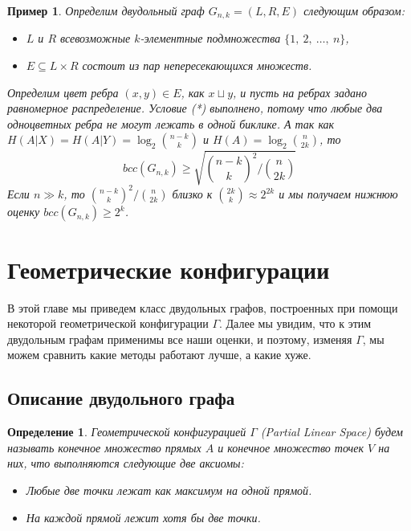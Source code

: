 \documentclass[a4paper]{article}
\newtheorem*{mdefinition}{Определение}
\newtheorem*{mexample}{Пример}
\begin{document}
\begin{mexample}
    Определим двудольный граф $G_{n,k} = (L, R, E)$ следующим образом: 
    \begin{itemize}[noitemsep]
        \item $L$ и $R$ всевозможные $k$-элементные подмножества $\{1,\ 2,\ \ldots,\ n\}$,
        \item $E\subseteq L\times R$ состоит из пар непересекающихся множеств.
    \end{itemize}
    Определим цвет ребра $(x, y)\in E$, как $x\sqcup y$, и пусть на ребрах задано равномерное распределение.
    Условие (*) выполнено, потому что любые два одноцветных ребра не могут лежать в одной биклике. А так как 
    $H(A|X) = H(A|Y) = \log_2\binom{n-k}{k}$ и $H(A) = \log_2\binom{n}{2k}$, то $$bcc(G_{n,k}) \geq 
    \sqrt{\binom{n-k}{k}^2 / \binom{n}{2k}}$$
    Если $n \gg k$, то $\binom{n-k}{k}^2 / \binom{n}{2k}$ близко к $\binom{2k}{k}\approx 2^{2k}$ и мы 
    получаем нижнюю оценку $bcc(G_{n,k})\geq 2^k$.
\end{mexample}


\addtocounter{section}{1}
\section*{Геометрические конфигурации}
В этой главе мы приведем класс двудольных графов, построенных при помощи некоторой геометрической 
конфигурации $\Gamma$. Далее мы увидим, что к этим двудольным графам применимы все наши оценки, и поэтому, 
изменяя $\Gamma$, мы можем сравнить какие методы работают лучше, а какие хуже.

\setcounter{subsection}{0}
\subsection{Описание двудольного графа}
\begin{mdefinition}
    Геометрической конфигурацией $\Gamma$ (Partial Linear Space) будем называть конечное множество 
    прямых $A$ и конечное множество точек $V$ на них, что выполняются следующие две аксиомы:
    \begin{itemize}[noitemsep]
        \item Любые две точки лежат как максимум на одной прямой.
        \item На каждой прямой лежит хотя бы две точки.
    \end{itemize}
\end{mdefinition}
\end{document}
